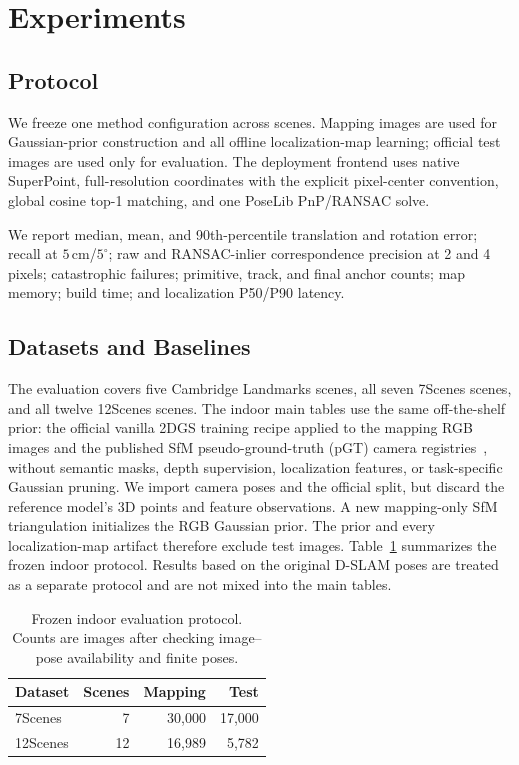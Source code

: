 \section{Experiments}

\subsection{Protocol}

We freeze one method configuration across scenes. Mapping images are used for
Gaussian-prior construction and all offline localization-map learning; official
test images are used only for evaluation. The deployment frontend uses native
SuperPoint, full-resolution coordinates with the explicit pixel-center
convention, global cosine top-1 matching, and one PoseLib PnP/RANSAC solve.

We report median, mean, and 90th-percentile translation and rotation error;
recall at $5\,$cm/$5^\circ$; raw and RANSAC-inlier correspondence precision at
2 and 4 pixels; catastrophic failures; primitive, track, and final anchor
counts; map memory; build time; and localization P50/P90 latency.

\subsection{Datasets and Baselines}

The evaluation covers five Cambridge Landmarks scenes, all seven 7Scenes
scenes, and all twelve 12Scenes scenes. The indoor main tables use the same
off-the-shelf prior: the official vanilla 2DGS training recipe applied to the
mapping RGB images and the published SfM pseudo-ground-truth (pGT) camera
registries~\cite{brachmann2021pgt}, without semantic masks, depth supervision,
localization features, or task-specific Gaussian pruning. We import camera
poses and the official split, but discard the reference model's 3D points and
feature observations. A new mapping-only SfM triangulation initializes the RGB
Gaussian prior. The prior and every localization-map artifact therefore
exclude test images. Table~\ref{tab:indoor_protocol} summarizes the frozen
indoor protocol. Results based on the original D-SLAM poses are treated as a
separate protocol and are not mixed into the main tables.

\begin{table}[t]
  \centering
  \caption{Frozen indoor evaluation protocol. Counts are images after checking
  image--pose availability and finite poses.}
  \label{tab:indoor_protocol}
  \small
  \begin{tabular}{lrrr}
    \toprule
    Dataset & Scenes & Mapping & Test \\
    \midrule
    7Scenes  & 7  & 30,000 & 17,000 \\
    12Scenes & 12 & 16,989 & 5,782 \\
    \bottomrule
  \end{tabular}
\end{table}

